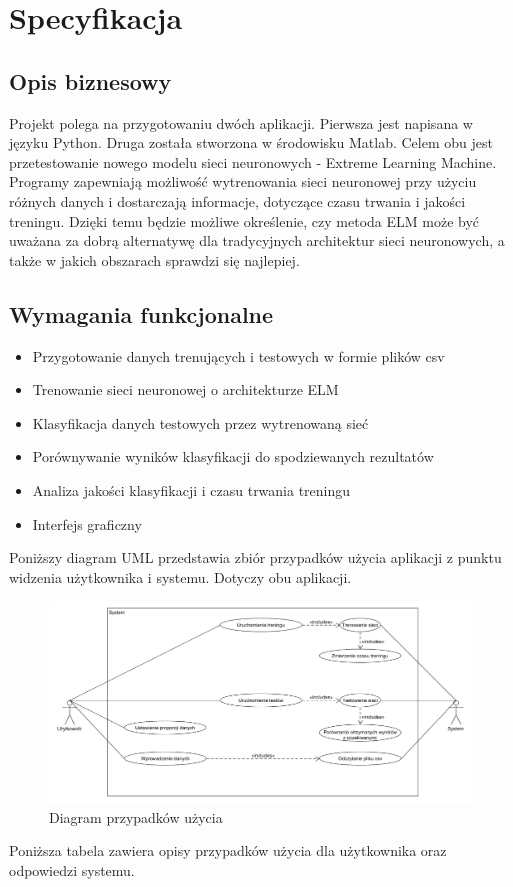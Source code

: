 \documentclass{article}
\begin{document}
\section{Specyfikacja}
\subsection{Opis biznesowy}
Projekt polega na przygotowaniu dwóch aplikacji. Pierwsza jest napisana w języku Python. Druga została stworzona w środowisku Matlab. Celem obu jest przetestowanie nowego modelu sieci neuronowych - Extreme Learning Machine. Programy zapewniają możliwość wytrenowania sieci neuronowej przy użyciu różnych danych i dostarczają informacje, dotyczące czasu trwania i jakości treningu. Dzięki temu będzie możliwe określenie, czy metoda ELM może być uważana za dobrą alternatywę dla tradycyjnych architektur sieci neuronowych, a także w jakich obszarach sprawdzi się najlepiej.
\subsection{Wymagania funkcjonalne}
\begin{itemize}
\item Przygotowanie danych trenujących i testowych w formie plików csv
\item Trenowanie sieci neuronowej o architekturze ELM
\item Klasyfikacja danych testowych przez wytrenowaną sieć
\item Porównywanie wyników klasyfikacji do spodziewanych rezultatów
\item Analiza jakości klasyfikacji i  czasu trwania treningu
\item Interfejs graficzny
\end{itemize}
Poniższy diagram UML przedstawia zbiór przypadków użycia aplikacji z punktu widzenia użytkownika i systemu. Dotyczy obu aplikacji.
\begin{figure}[H]
\hspace*{-1.5cm}
\includegraphics[width=16cm]{use_case.png}
\caption{Diagram przypadków użycia}
\end{figure}
Poniższa tabela zawiera opisy przypadków użycia dla użytkownika oraz odpowiedzi systemu.
\end{document}
